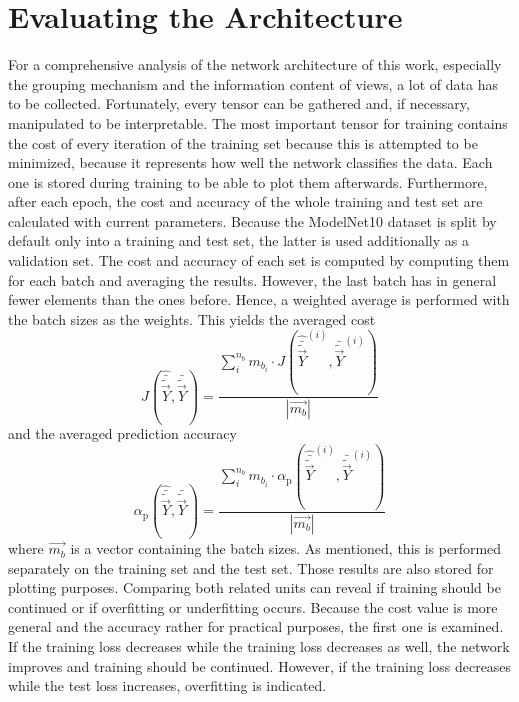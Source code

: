 \section{Evaluating the Architecture}
\label{sec:methods-evaluate}
For a comprehensive analysis of the network architecture of this work, especially the grouping mechanism and the information content of views, a lot of data has to be collected.
Fortunately, every tensor can be gathered and, if necessary, manipulated to be interpretable.
The most important tensor for training contains the cost of every iteration of the training set because this is attempted to be minimized, because it represents how well the network classifies the data.
Each one is stored during training to be able to plot them afterwards.
Furthermore, after each epoch, the cost and accuracy of the whole training and test set are calculated with current parameters.
Because the ModelNet10 dataset is split by default only into a training and test set, the latter is used additionally as a validation set.
The cost and accuracy of each set is computed by computing them for each batch and averaging the results.
However, the last batch has in general fewer elements than the ones before.
Hence, a weighted average is performed with the batch sizes as the weights.
This yields the averaged cost
\begin{equation}
	J\left(\hat{\bar{\tilde{\vec{Y}}}}, \bar{\tilde{\vec{Y}}}\right) =  \frac{\sum_{i}^{n_b} m_{b_i} \cdot J\left(\hat{\bar{\tilde{\vec{Y}}}}^{(i)}, \bar{\tilde{\vec{Y}}}^{(i)}\right)}{\left|\vec{m_b}\right|}
\end{equation}
and the averaged prediction accuracy
\begin{equation}
	\alpha_\text{p}\left(\hat{\bar{\tilde{\vec{Y}}}}, \bar{\tilde{\vec{Y}}}\right) =  \frac{\sum_{i}^{n_b} m_{b_i} \cdot \alpha_\text{p}\left(\hat{\bar{\tilde{\vec{Y}}}}^{(i)}, \bar{\tilde{\vec{Y}}}^{(i)}\right)}{\left|\vec{m_b}\right|}
\end{equation}
where $\vec{m_b}$ is a vector containing the batch sizes.
As mentioned, this is performed separately on the training set and the test set.
Those results are also stored for plotting purposes.
Comparing both related units can reveal if training should be continued or if overfitting or underfitting occurs.
Because the cost value is more general and the accuracy rather for practical purposes, the first one is examined.
If the training loss decreases while the training loss decreases as well, the network improves and training should be continued.
However, if the training loss decreases while the test loss increases, overfitting is indicated.

